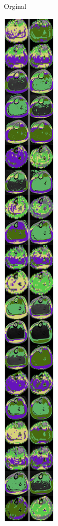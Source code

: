 \documentclass[conference]{IEEEtran}
\begin{document}
\begin{figure}[!htb]
\begin{subfigure}[b]{0.13\textwidth}
		\caption{Orginal}
		\label{fig:imgOrginal}
	\end{subfigure}
	\begin{subfigure}[b]{0.13\textwidth}
		\includegraphics[width=\textwidth]{Umbrales/kapur/Dim7/RSA_HBA_Dim7_Kapur.png}

\end{subfigure}
\end{figure}
\end{document}
